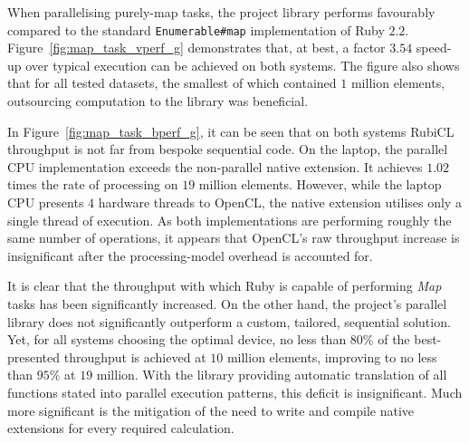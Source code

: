 When parallelising purely-map tasks, the project library performs favourably compared to the standard \verb|Enumerable#map| implementation of Ruby $2.2$. Figure~\ref{fig:map_task_vperf_g} demonstrates that, at best, a factor $3.5$\textendash$4$ speed-up over typical execution can be achieved on both systems.
The figure also shows that for all tested datasets, the smallest of which contained $1$ million elements, outsourcing computation to the library was beneficial.

In Figure~\ref{fig:map_task_bperf_g}, it can be seen that on both systems RubiCL throughput is not far from bespoke sequential code. On the laptop, the parallel \ac{CPU} implementation exceeds the non-parallel native extension. It achieves $1.02$ times the rate of processing on $19$ million elements.
However, while the laptop \ac{CPU} presents $4$ hardware threads to \ac{OpenCL}, the native extension utilises only a single thread of execution. As both implementations are performing roughly the same number of operations, it appears that \ac{OpenCL}'s raw throughput increase is insignificant after the processing-model overhead is accounted for.

It is clear that the throughput with which Ruby is capable of performing \emph{Map} tasks has been significantly increased.
On the other hand, the project's parallel library does not significantly outperform a custom, tailored, sequential solution.
Yet, for all systems choosing the optimal device, no less than $80\%$ of the best-presented throughput is achieved at $10$ million elements, improving to no less than $95\%$ at $19$ million.
With the library providing automatic translation of all functions stated into parallel execution patterns, this deficit is insignificant. Much more significant is the mitigation of the need to write and compile native extensions for every required calculation.


